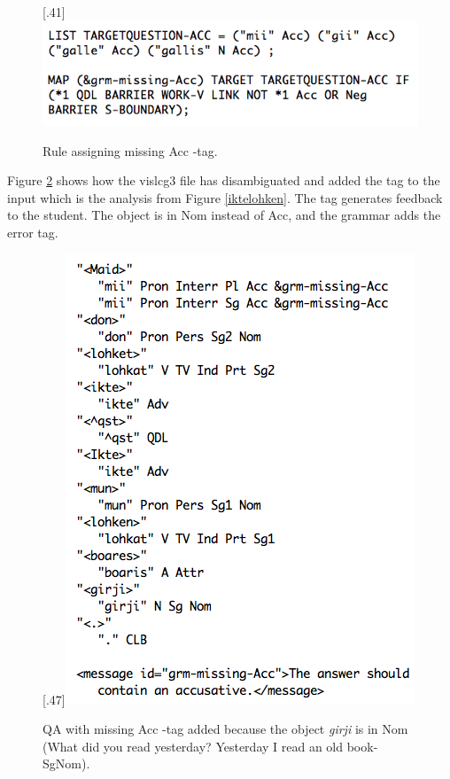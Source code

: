 \documentclass[11pt]{article}
\begin{document}
\begin{figure}[tbp]
\begin{center}
\scalebox{.41}[.41]{\includegraphics{presentation/img/pedcg3ny.png}}
\caption{Rule assigning missing Acc -tag.}
\label{cg3}
\end{center}
\end{figure}

Figure \ref{maidlohket} shows how the vislcg3 file has disambiguated and added the tag to the input which is the analysis from Figure \ref{iktelohken}. The tag generates feedback to the student. The object is in Nom instead of Acc, and the grammar adds the error tag.

\begin{figure}[tbp]
\begin{center}
\scalebox{.47}[.47]{\includegraphics{presentation/img/vasta_feedback2.png}}
\caption{QA with missing Acc -tag added because the object \textit{girji} is in Nom (What did you read yesterday? Yesterday I read an old book-SgNom).}
\label{maidlohket}
\end{center}
\end{figure}
\end{document}
